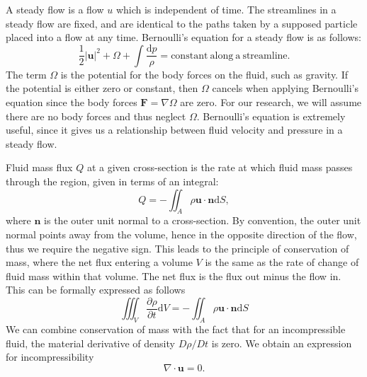 \documentclass{report}
\begin{document}
A steady flow is a flow $u$ which is independent of time.
The streamlines in a steady flow are fixed, and are identical to the paths taken by a supposed particle placed into a flow at any time.
Bernoulli's equation for a steady flow is as follows:
\begin{equation}
    \frac{1}{2}|\mathbf{u}|^2 + \Omega + \int\frac{\mathrm{d}p}{\rho} = \mathrm{constant~along~a~streamline}.
\end{equation}
The term $\Omega$ is the potential for the body forces on the fluid, such as gravity.
If the potential is either zero or constant,
then $\Omega$ cancels when applying Bernoulli's equation since the body forces $\mathbf{F} = \nabla \Omega$ are zero. %
For our research, we will assume there are no body forces and thus neglect $\Omega$.
Bernoulli's equation is extremely useful, since it gives us a relationship between fluid velocity and pressure in a steady flow.

Fluid mass flux $Q$ at a given cross-section is the rate at which fluid mass passes through the region,
given in terms of an integral:
\begin{equation*}
    Q = -\iint_A \rho \mathbf{u} \cdot \mathbf{n} \mathrm{d}S,
\end{equation*}
where $\mathbf{n}$ is the outer unit normal to a cross-section.
By convention, the outer unit normal points away from the volume,
hence in the opposite direction of the flow, thus we require the negative sign.
This leads to the principle of conservation of mass, where the net flux entering a volume $V$ is the same as the rate of change of fluid mass within that volume.
The net flux is the flux out minus the flow in.
This can be formally expressed as follows
\begin{equation*}
    \iiint_V \frac{\partial\rho}{\partial t} \mathrm{d}V = - \iint_A \rho \mathbf{u} \cdot \mathbf{n} \mathrm{d}S 
\end{equation*}
We can combine conservation of mass with the fact that for an incompressible fluid,
the material derivative of density $D\rho / Dt$ is zero.
We obtain an expression for incompressibility
\begin{equation*}
	\nabla \cdot \mathbf{u} = 0.
\end{equation*}
\end{document}
